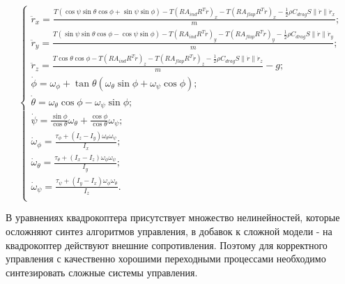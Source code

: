 \begin{equation}
\begin{cases}
    \ddot{r}_x = \frac{T (\cos \psi \sin \theta \cos \phi + \sin \psi \sin \phi) - T (R A_{ind} R^T \dot{r})_x - T (R A_{flap} R^T \dot{r})_x - \frac{1}{2} \rho C_{drag} S \|\dot{r}\| \dot{r}_x}{m}; \\
    \ddot{r}_y = \frac{T (\sin \psi \sin \theta \cos \phi - \cos \psi \sin \phi) - T (R A_{ind} R^T \dot{r})_y - T (R A_{flap} R^T \dot{r})_y - \frac{1}{2} \rho C_{drag} S \|\dot{r}\| \dot{r}_y}{m}; \\
    \ddot{r}_z = \frac{T \cos\theta\cos\phi - T (R A_{ind} R^T \dot{r})_z - T (R A_{flap} R^T \dot{r})_z - \frac{1}{2} \rho C_{drag} S \|\dot{r}\| \dot{r}_z}{m} - g; \\
    \dot{\phi} = \omega_{\phi} + \tan\theta (\omega_{\theta} \sin\phi + \omega_{\psi} \cos\phi); \\
    \dot{\theta} = \omega_{\theta} \cos\phi - \omega_{\psi} \sin\phi; \\
    \dot{\psi} = \frac{\sin\phi}{\cos\theta} \omega_{\theta} + \frac{\cos\phi}{\cos\theta} \omega_{\psi}; \\
    \dot{\omega}_{\phi} = \frac{\tau_{\phi}+(I_z-I_y) \omega_{\theta} \omega_{\psi}}{I_{x}}; \\
    \dot{\omega}_{\theta} = \frac{\tau_{\theta}+(I_x-I_z) \omega_{\phi} \omega_{\psi}}{I_{y}}; \\
    \dot{\omega}_{\psi} = \frac{\tau_{\psi}+(I_y-I_x) \omega_{\phi} \omega_{\theta}}{I_{z}}. \\
\end{cases}
\label{eq:system}
\end{equation}

В уравнениях квадрокоптера присутствует множество нелинейностей, которые 
осложняют синтез алгоритмов управления, в добавок к сложной модели - на квадрокоптер действуют внешние сопротивления.
Поэтому для корректного управления с качественно хорошими 
переходными процессами необходимо синтезировать 
сложные системы управления.


\endinput